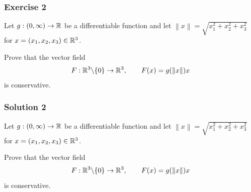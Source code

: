 \documentclass[10pt, t, allowdisplaybreaks]{beamer}
\newcommand{\nullspacesmall}{~\vspace{1em}}
\begin{document}
\begin{frame}
    \frametitle{Exercise 2}
    \par Let $g:(0, \infty)\rightarrow \mathbb{R}$ be a differentiable function and let
    $\left\lVert x\right\rVert = \sqrt{x^2_1+x^2_2+x^2_3}$ for $x = (x_1, x_2, x_3)\in \mathbb{R}^3$.
    \par Prove that the vector field
    \begin{equation*}
        F:\mathbb{R}^3\backslash\{0\}\rightarrow \mathbb{R}^3, \qquad F(x) = g(\left\lVert x\right\rVert )x
    \end{equation*}
    is conservative.
\end{frame}

\begin{frame}
    \frametitle{Solution 2}
    \par Let $g:(0, \infty)\rightarrow \mathbb{R}$ be a differentiable function and let
    $\left\lVert x\right\rVert = \sqrt{x^2_1+x^2_2+x^2_3}$ for $x = (x_1, x_2, x_3)\in \mathbb{R}^3$.
    \par Prove that the vector field
    \begin{equation*}
        F:\mathbb{R}^3\backslash\{0\}\rightarrow \mathbb{R}^3, \qquad F(x) = g(\left\lVert x\right\rVert )x
    \end{equation*}
    is conservative.

    \nullspacesmall
\end{frame}
\end{document}
